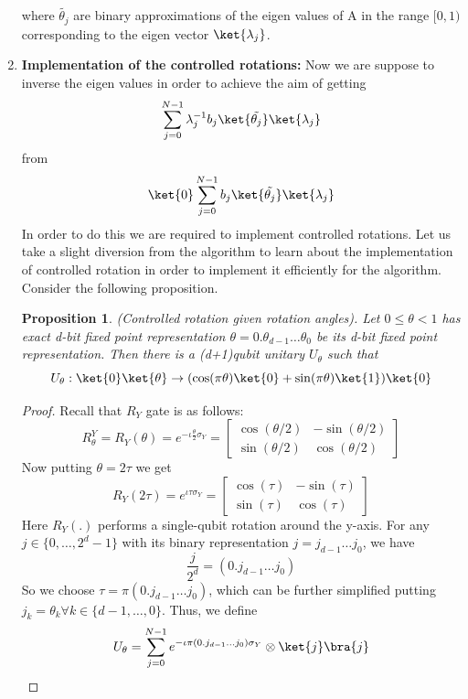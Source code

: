 \documentclass[12pt, oneside]{book}
\newtheorem{proposition}[theorem]{Proposition}
\theoremstyle{definition}
\theoremstyle{definition}
\theoremstyle{remark}
\begin{document}
\begin{enumerate}
\[    \]
    where $\tilde{\theta_j}$ are binary approximations of the eigen values of A in the range $[0,1)$ corresponding to the eigen vector $\ket{\lambda_j}$.
    \item \textbf{Implementation of the controlled rotations: }Now we are suppose to inverse the eigen values in order to achieve the aim of getting
    \[
    \sum_{j=0}^{N-1} \lambda_j^{-1} b_j\ket{\tilde{\theta_j}}\ket{\lambda_j}
    \]
    from
    \[
    \ket{0}\sum_{j=0}^{N-1}b_j\ket{\tilde{\theta_j}}\ket{\lambda_j}
    \]
    In order to do this we are required to implement controlled rotations.
    Let us take a slight diversion from the algorithm to learn about the implementation of controlled rotation in order to implement it efficiently for the algorithm. Consider the following proposition.
    \begin{proposition}
        (Controlled rotation given rotation angles). Let $0\leq \theta <1$ has exact d-bit fixed point representation $\theta=0.\theta_{d-1}\ldots\theta_0$ be its d-bit fixed point representation. Then there is a (d+1)qubit unitary $U_{\theta}$ such that
        \[
        U_{\theta}:\ket{0}\ket{\theta}\rightarrow (\cos (\pi \theta) \ket{0} + \sin (\pi\theta) \ket{1})\ket{0}
        \]
    \end{proposition}
    \begin{proof}
        Recall that $R_Y$ gate is as follows:
        \[
        R_{\theta}^Y=R_Y(\theta)=e^{-\iota \frac{\theta}{2}\sigma_Y}=\begin{bmatrix} \cos (\theta/2) & -\sin (\theta/2) \\ \sin (\theta/2) & \cos (\theta/2) \end{bmatrix}
        \]
        Now putting $\theta=2\tau$ we get
        \[
        R_Y(2\tau) =e^{\iota \tau \sigma_Y}=\begin{bmatrix} \cos (\tau) & -\sin(\tau) \\ \sin(\tau) & \cos (\tau) \end{bmatrix}
        \]
        Here $R_Y(.)$ performs a single-qubit rotation around the y-axis. For any $j \in \{0,\ldots,2^d-1\}$ with its binary representation $j=j_{d-1}\ldots j_0$, we have
        \[\frac{j}{2^d}=(0.j_{d-1}\ldots j_0)\]
        So we choose $\tau=\pi(0.j_{d-1}\ldots j_0)$, which can be further simplified putting $j_k=\theta_k \forall k \in\{d-1,\ldots,0\}$. Thus, we define
        \begin{align*}
        U_{\theta}&=\sum_{j=0}^{N-1} e^{-\iota \pi(0.j_{d-1}\ldots j_0)\sigma_Y} \otimes \ket{j}\bra{j}\\

\end{align*}
\end{proof}
\end{enumerate}
\end{document}

